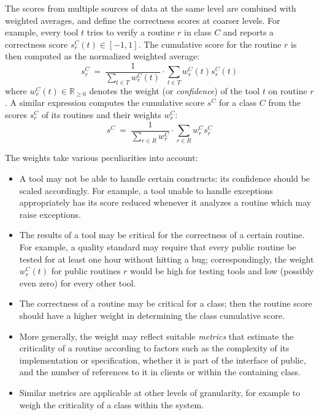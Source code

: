 The scores from multiple sources of data at the same level are combined with weighted averages, and define the correctness scores at coarser levels.  
For example, every tool $t$ tries to verify a routine $r$ in class $C$ and reports a correctness score $s_r^C(t) \in [-1,1]$.
The cumulative score for the routine $r$ is then computed as the normalized weighted average:
\begin{equation}
s_r^C \ =\ \frac{1}{\sum_{t \in T} w_r^C(t)} \cdot \sum_{t \in T} w_r^C(t)s_r^C(t)
\label{eq:routine}
\end{equation}
where $w_r^C(t) \in \mathbb{R}_{\geq 0}$ denotes the weight (or \emph{confidence}) of the tool $t$ on routine $r$.
A similar expression computes the cumulative score $s^C$ for a class $C$ from the scores $s_r^C$ of its routines and their weights $w_r^C$:
\begin{equation}
s^C \ =\ \frac{1}{\sum_{r \in R} w_r^C} \cdot \sum_{r \in R} w_r^Cs_r^C
\label{eq:class}
\end{equation}

The weights take various peculiarities into account:
\begin{itemize}
\item
A tool may not be able to handle certain constructs: its confidence should be scaled accordingly.
For example, a tool unable to handle exceptions appropriately has its score reduced whenever it analyzes a routine which may raise exceptions.

\item
The results of a tool may be critical for the correctness of a certain routine.
For example, a quality standard may require that every public routine be tested for at least one hour without hitting a bug; correspondingly, the weight $w_r^C(t)$ for public routines $r$ would be high for testing tools and low (possibly even zero) for every other tool.

\item
The correctness of a routine may be critical for a class; then the routine score should have a higher weight in determining the class cumulative score.

\item
More generally, the weight may reflect suitable \emph{metrics} that estimate the criticality of a routine according to factors such as the complexity of its implementation or specification, whether it is part of the interface of public, and the number of references to it in clients or within the containing class.

\item
Similar metrics are applicable at other levels of granularity, for example to weigh the criticality of a class within the system.

\end{itemize}

